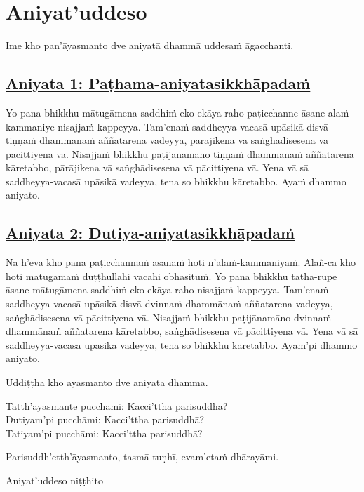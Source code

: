 \section{Aniyat'uddeso}
\label{aniy}

\begin{intro}
  Ime kho pan'āyasmanto dve aniyatā dhammā uddesaṁ āgacchanti.
\end{intro}

\subsection*{\hyperref[unc1]{Aniyata 1: Paṭhama-aniyatasikkhāpadaṁ}}
\label{aniy1}

Yo pana bhikkhu mātugāmena saddhiṁ eko ekāya raho paṭicchanne āsane alaṁ-kammaniye nisajjaṁ kappeyya. Tam’enaṁ saddheyya-vacasā upāsikā disvā tiṇṇaṁ dhammānaṁ aññatarena vadeyya, pārājikena vā saṅghādisesena vā pācittiyena vā. Nisajjaṁ bhikkhu paṭijānamāno tiṇṇaṁ dhammānaṁ aññatarena kāretabbo, pārājikena vā saṅghādisesena vā pācittiyena vā. Yena vā sā saddheyya-vacasā upāsikā vadeyya, tena so bhikkhu kāretabbo. Ayaṁ dhammo aniyato.

\subsection*{\hyperref[unc2]{Aniyata 2: Dutiya-aniyatasikkhāpadaṁ}}
\label{aniy2}

Na h’eva kho pana paṭicchannaṁ āsanaṁ hoti n'ālaṁ-kammaniyaṁ. Alañ-ca kho hoti mātugāmaṁ duṭṭhullāhi vācāhi obhāsituṁ. Yo pana bhikkhu tathā-rūpe āsane mātugāmena saddhiṁ eko ekāya raho nisajjaṁ kappeyya. Tam’enaṁ saddheyya-vacasā upāsikā disvā dvinnaṁ dhammānaṁ aññatarena vadeyya, saṅghādisesena vā pācittiyena vā. Nisajjaṁ bhikkhu paṭijānamāno dvinnaṁ dhammānaṁ aññatarena kāretabbo, saṅghādisesena vā pācittiyena vā. Yena vā sā saddheyya-vacasā upāsikā vadeyya, tena so bhikkhu kāretabbo. Ayam'pi dhammo aniyato.

\medskip

\begin{center}
Uddiṭṭhā kho āyasmanto dve aniyatā dhammā.

\smallskip

Tatth'āyasmante pucchāmi: Kacci'ttha parisuddhā?\\
Dutiyam'pi pucchāmi: Kacci'ttha parisuddhā?\\
Tatiyam'pi pucchāmi: Kacci'ttha parisuddhā?

\smallskip

Parisuddh'etth'āyasmanto, tasmā tuṇhī, evam'etaṁ dhārayāmi.
\end{center}

\begin{outro}
Aniyat’uddeso niṭṭhito
\end{outro}

\clearpage
